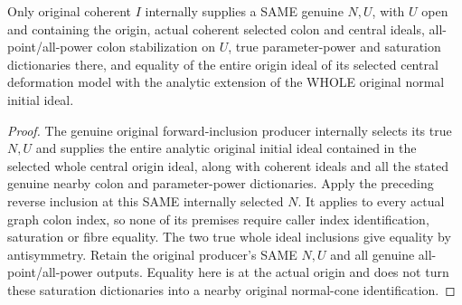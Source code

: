 \begin{theorem}
\label{hir:relative-normal-graph-central-whole-origin-ideal-equality}
\leanok
Only original coherent $I$ internally supplies a SAME genuine $N,U$, with $U$ open and containing the origin, actual coherent selected colon and central ideals, all-point/all-power colon stabilization on $U$, true parameter-power and saturation dictionaries there, and equality of the entire origin ideal of its selected central deformation model with the analytic extension of the WHOLE original normal initial ideal.
\end{theorem}
\begin{proof}
The genuine original forward-inclusion producer internally selects its true $N,U$ and supplies the entire analytic original initial ideal contained in the selected whole central origin ideal, along with coherent ideals and all the stated genuine nearby colon and parameter-power dictionaries. Apply the preceding reverse inclusion at this SAME internally selected $N$. It applies to every actual graph colon index, so none of its premises require caller index identification, saturation or fibre equality. The two true whole ideal inclusions give equality by antisymmetry. Retain the original producer's SAME $N,U$ and all genuine all-point/all-power outputs. Equality here is at the actual origin and does not turn these saturation dictionaries into a nearby original normal-cone identification.
\end{proof}

